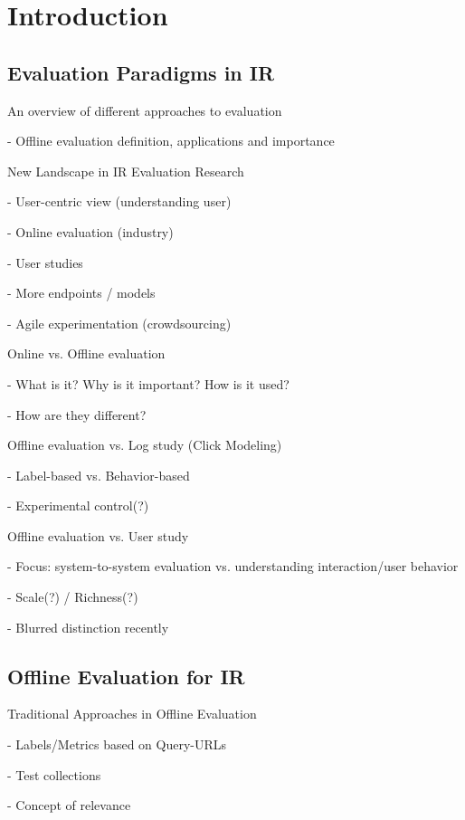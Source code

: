 \documentclass[openany]{now} %
\newcommand{\newpar}{\bigskip\noindent}
\begin{document}
\chapter{Introduction}
\label{c-intro}

\section{Evaluation Paradigms in IR}

An overview of different approaches to evaluation

- Offline evaluation definition, applications and importance

\newpar
New Landscape in IR Evaluation Research

- User-centric view (understanding user)

- Online evaluation (industry)

- User studies

- More endpoints / models

- Agile experimentation (crowdsourcing)

\newpar
Online \cite{INR-XYZ} vs. Offline evaluation \cite{INR-009} 

- What is it? Why is it important? How is it used?

- How are they different?


\newpar
Offline evaluation vs. Log study (Click Modeling) \cite{chuklin2015click}

- Label-based vs. Behavior-based

- Experimental control(?)

\newpar
Offline evaluation vs. User study \cite{kelly2009methods}

- Focus: system-to-system evaluation vs. understanding interaction/user behavior

- Scale(?) / Richness(?)

- Blurred distinction recently
\cite{Bron:2013}
\cite{Liu:2014}
\cite{Shah:2011}


\section{Offline Evaluation for IR}

Traditional Approaches in Offline Evaluation

- Labels/Metrics based on Query-URLs

- Test collections 

- Concept of relevance 

\cite{borlund2003} \cite{cleverdon67} \cite{voor:trec05}
\end{document}
